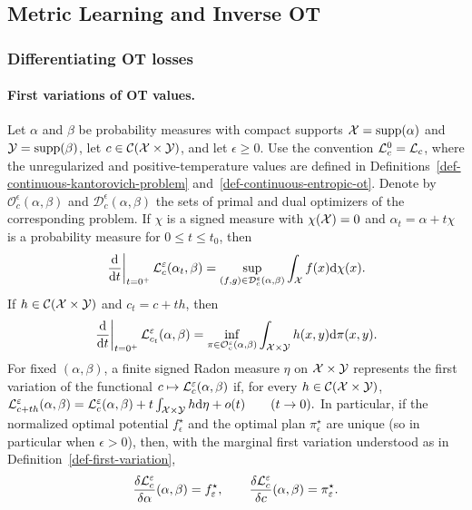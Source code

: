\subsection{Metric Learning and Inverse OT}
\label{sec-metric-learning-inverse-ot}
\subsubsection{Differentiating OT losses}
\paragraph{First variations of OT values.}
\begin{prop}\label{prop-ot-first-variations-unregularized}\label{prop-ot-first-variations-entropic}
Let $\alpha$ and $\beta$ be probability measures with compact supports $\mathcal{X}=\operatorname{supp}(\alpha)$ and $\mathcal{Y}=\operatorname{supp}(\beta)$, let $c\in\mathcal{C}(\mathcal{X}\times\mathcal{Y})$, and let $\epsilon\geq0$. Use the convention $\mathcal{L}_c^0=\mathcal{L}_c$, where the unregularized and positive-temperature values are defined in Definitions~\ref{def-continuous-kantorovich-problem} and~\ref{def-continuous-entropic-ot}. Denote by $\mathcal O_c^\epsilon(\alpha,\beta)$ and $\mathcal D_c^\epsilon(\alpha,\beta)$ the sets of primal and dual optimizers of the corresponding problem.
If $\chi$ is a signed measure with $\chi(\mathcal{X})=0$ and $\alpha_t=\alpha+t\chi$ is a probability measure for $0\leq t\leq t_0$, then
\[
\left.\frac{\mathrm{d}}{\mathrm{d} t}\right|_{t=0^+}
\mathcal{L}_c^\varepsilon(\alpha_t,\beta)
=
\sup_{(f,g)\in\mathcal D_c^\varepsilon(\alpha,\beta)}
\int_{\mathcal{X}} f(x)\mathrm{d}\chi(x).
\]
If $h\in\mathcal{C}(\mathcal{X}\times\mathcal{Y})$ and $c_t=c+th$, then
\[
\left.\frac{\mathrm{d}}{\mathrm{d} t}\right|_{t=0^+}
\mathcal{L}_{c_t}^\varepsilon(\alpha,\beta)
=
\inf_{\pi\in\mathcal O_c^\varepsilon(\alpha,\beta)}
\int_{\mathcal{X}\times\mathcal{Y}} h(x,y)\mathrm{d}\pi(x,y).
\]
For fixed $(\alpha,\beta)$, a finite signed Radon measure $\eta$ on $\mathcal{X}\times\mathcal{Y}$ represents the first variation of the functional $c\mapsto\mathcal{L}_c^\varepsilon(\alpha,\beta)$ if, for every $h\in\mathcal{C}(\mathcal{X}\times\mathcal{Y})$,
\(\mathcal{L}_{c+t h}^\varepsilon(\alpha,\beta) = \mathcal{L}_c^\varepsilon(\alpha,\beta) +t\int_{\mathcal{X}\times\mathcal{Y}}h\mathrm{d}\eta+o(t) \qquad(t\to0).\)
In particular, if the normalized optimal potential $f_\epsilon^\star$ and the optimal plan $\pi_\epsilon^\star$ are unique (so in particular when $\epsilon>0$), then, with the marginal first variation understood as in Definition~\ref{def-first-variation},
\[
\frac{\delta \mathcal{L}_c^\varepsilon}{\delta\alpha}(\alpha,\beta)=f_\varepsilon^\star,
\qquad
\frac{\delta \mathcal{L}_c^\varepsilon}{\delta c}(\alpha,\beta)=\pi_\varepsilon^\star.
\]
\end{prop}
